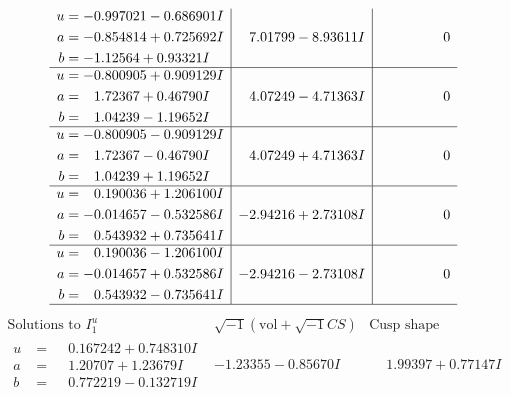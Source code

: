\documentclass[1p]{elsarticle_modified}
\theoremstyle{definition}
\newcommand{\I}{\sqrt{-1}}
\begin{document}
$$\begin{array}{c|c|c}
\begin{aligned}
u &= -0.997021 - 0.686901 I \\
a &= -0.854814 + 0.725692 I \\
b &= -1.12564 + 0.93321 I\end{aligned}
 & \phantom{-}7.01799 - 8.93611 I & \phantom{-0.000000 } 0 \\ \hline\begin{aligned}
u &= -0.800905 + 0.909129 I \\
a &= \phantom{-}1.72367 + 0.46790 I \\
b &= \phantom{-}1.04239 - 1.19652 I\end{aligned}
 & \phantom{-}4.07249 - 4.71363 I & \phantom{-0.000000 } 0 \\ \hline\begin{aligned}
u &= -0.800905 - 0.909129 I \\
a &= \phantom{-}1.72367 - 0.46790 I \\
b &= \phantom{-}1.04239 + 1.19652 I\end{aligned}
 & \phantom{-}4.07249 + 4.71363 I & \phantom{-0.000000 } 0 \\ \hline\begin{aligned}
u &= \phantom{-}0.190036 + 1.206100 I \\
a &= -0.014657 - 0.532586 I \\
b &= \phantom{-}0.543932 + 0.735641 I\end{aligned}
 & -2.94216 + 2.73108 I & \phantom{-0.000000 } 0 \\ \hline\begin{aligned}
u &= \phantom{-}0.190036 - 1.206100 I \\
a &= -0.014657 + 0.532586 I \\
b &= \phantom{-}0.543932 - 0.735641 I\end{aligned}
 & -2.94216 - 2.73108 I & \phantom{-0.000000 } 0\\
 \hline 
 \end{array}$$\newpage$$\begin{array}{c|c|c}  
\text{Solutions to }I^u_{1}& \I (\text{vol} + \sqrt{-1}CS) & \text{Cusp shape}\\
 \hline 
\begin{aligned}
u &= \phantom{-}0.167242 + 0.748310 I \\
a &= \phantom{-}1.20707 + 1.23679 I \\
b &= \phantom{-}0.772219 - 0.132719 I\end{aligned}
 & -1.23355 - 0.85670 I & \phantom{-}1.99397 + 0.77147 I \\ \hline\begin{aligned}

\end{aligned}
\end{array}$$
\end{document}
